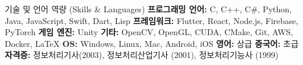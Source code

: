 \begin{rubric}{기술 및 언어 역량 (Skills \& Languages)}
     \textbf{프로그래밍 언어: } C, C++, C\#, Python, Java, JavaScript, Swift, Dart, Lisp
     \textbf{프레임워크:} Flutter, React, Node.js, Firebase, PyTorch
     \textbf{게임 엔진:} Unity
     \textbf{기타:} OpenCV, OpenGL, CUDA, CMake, Git, AWS, Docker, \LaTeX
     \textbf{OS:} Windows, Linux, Mac, Android, iOS
    \entry*[Languages] \textbf{영어: } 상급
    \entry*[Languages] \textbf{중국어: } 초급
    \entry*[Qualifications] \textbf{자격증: } 정보처리기사(2003), 정보처리산업기사 (2001), 정보처리기능사 (1999)
\end{rubric}